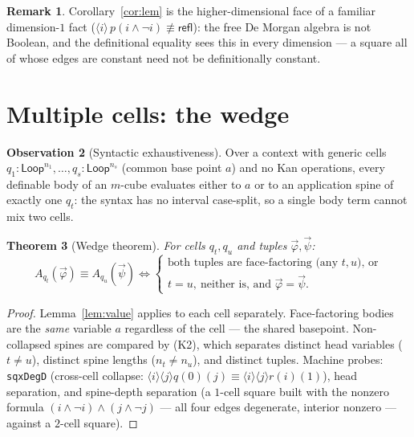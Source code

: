 \documentclass[11pt]{amsart}
\newtheorem{thm}{Theorem}[section]
\theoremstyle{definition}
\newtheorem{rem}[thm]{Remark}
\newtheorem{obs}[thm]{Observation}
\newcommand{\aconv}{\equiv}
\newcommand{\nconv}{\not\equiv}
\newcommand{\refl}{\mathsf{refl}}
\newcommand{\Loop}{\mathsf{Loop}}
\newcommand{\act}[1]{A_{#1}}
\begin{document}
\begin{rem}
  Corollary~\ref{cor:lem} is the higher-dimensional face of a
  familiar dimension-$1$ fact ($\langle i \rangle\, p(i \wedge \neg
  i) \nconv \refl$): the free De Morgan algebra is not Boolean, and
  the definitional equality sees this in every dimension --- a
  square all of whose edges are constant need not be definitionally
  constant.
\end{rem}

\section{Multiple cells: the wedge}
\label{sec:multi}

\begin{obs}[Syntactic exhaustiveness]\label{obs:exhaustive}
  Over a context with generic cells $q_1 : \Loop^{n_1}, \dots,
  q_s : \Loop^{n_s}$ (common base point $a$) and no Kan operations,
  every definable body of an $m$-cube evaluates either to $a$ or to
  an application spine of exactly one $q_t$: the syntax has no
  interval case-split, so a single body term cannot mix two cells.
\end{obs}

\begin{thm}[Wedge theorem]\label{thm:wedge}
  For cells $q_t, q_u$ and tuples $\vec\varphi, \vec\psi$:
  \[
    \act{q_t}(\vec\varphi) \aconv \act{q_u}(\vec\psi)
    \iff
    \begin{cases}
      \text{both tuples are face-factoring
        (any $t, u$), or}\\
      t = u,\ \text{neither is, and } \vec\varphi = \vec\psi.
    \end{cases}
  \]
\end{thm}
\begin{proof}
  Lemma~\ref{lem:value} applies to each cell separately.
  Face-factoring bodies are the \emph{same} variable $a$ regardless
  of the cell --- the shared basepoint.  Non-collapsed spines are
  compared by (K2), which separates distinct head variables
  ($t \ne u$), distinct spine lengths ($n_t \ne n_u$), and distinct
  tuples.  Machine probes: \texttt{sqxDegD} (cross-cell collapse:
  $\langle i\rangle\langle j\rangle q(0)(j) \aconv
  \langle i\rangle\langle j\rangle r(i)(1)$), head separation, and
  spine-depth separation (a $1$-cell square built with the nonzero
  formula $(i \wedge \neg i) \wedge (j \wedge \neg j)$ --- all four
  edges degenerate, interior nonzero --- against a $2$-cell
  square).
\end{proof}
\end{document}
